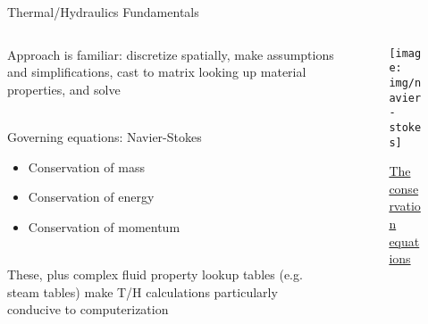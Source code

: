 \documentclass[pdf,aspectratio=169]{beamer}
\begin{document}
\begin{frame}{Thermal/Hydraulics Fundamentals}
\begin{columns}
    \begin{column}{0.7\textwidth}
        Approach is familiar: discretize spatially, make assumptions and simplifications, cast to matrix looking up material
        properties, and solve\\~\

        Governing equations: Navier-Stokes
        \begin{itemize}
            \item Conservation of mass 
            \item Conservation of energy
            \item Conservation of momentum\\~\
        \end{itemize}

        These, plus complex fluid property lookup tables (e.g. steam tables) make T/H
        calculations particularly conducive to computerization

    \end{column}
    \begin{column}{0.3\textwidth}
        \begin{figure}[ht]
        \centering
            \texttt{[image: img/navier-stokes]}
            \caption{\tiny \href{https://www.grc.nasa.gov/www/k-12/airplane/nseqs.html}{The conservation equations}}
        \end{figure}
    \end{column}
    \end{columns}
\end{frame}
\end{document}
